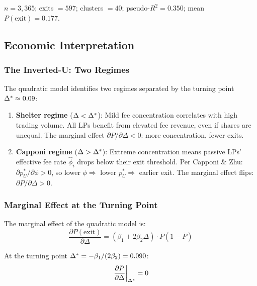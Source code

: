 $n = 3{,}365$; exits $= 597$; clusters $= 40$; pseudo-$R^2 = 0.350$;
mean $P(\text{exit}) = 0.177$.


\subsection{Economic Interpretation}\label{subsec:econ-interpretation}

\subsubsection{The Inverted-U: Two Regimes}

The quadratic model identifies two regimes separated by the turning point
$\Delta^{*} \approx 0.09$:

\begin{enumerate}
  \item \textbf{Shelter regime} ($\Delta < \Delta^{*}$): Mild fee concentration
    correlates with high trading volume. All LPs benefit from elevated fee
    revenue, even if shares are unequal. The marginal effect
    $\partial P / \partial \Delta < 0$: more concentration, fewer exits.

  \item \textbf{Capponi regime} ($\Delta > \Delta^{*}$): Extreme concentration
    means passive LPs' effective fee rate $\hat{\phi}_i$ drops below their exit
    threshold. Per Capponi \& Zhu:
    $\partial p_U^* / \partial \phi > 0$, so lower $\phi \Rightarrow$ lower
    $p_U^* \Rightarrow$ earlier exit. The marginal effect flips:
    $\partial P / \partial \Delta > 0$.
\end{enumerate}

\subsubsection{Marginal Effect at the Turning Point}

The marginal effect of the quadratic model is:
\begin{equation}\label{eq:marginal-effect}
  \frac{\partial P(\text{exit})}{\partial \Delta}
    = (\beta_1 + 2\beta_2 \Delta) \cdot \bar{P}(1 - \bar{P})
\end{equation}

At the turning point $\Delta^{*} = -\beta_1/(2\beta_2) = 0.090$:
\[
  \left.\frac{\partial P}{\partial \Delta}\right|_{\Delta^{*}} = 0
\]

